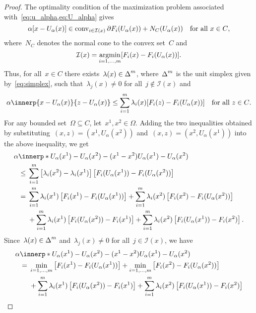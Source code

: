 \documentclass[../../main]{subfiles}
\begin{document}
\begin{proof}
    The optimality condition of the maximization problem associated with~\cref{eq:u_alpha,eq:U_alpha} gives
    \[
        \alpha [ x - U_\alpha(x) ] \in \operatorname{conv}_{i \in \mathcal{I}(x)} \partial F_i(U_\alpha(x)) + N_C(U_\alpha(x)) \quad \text{for all~$x \in C$}
    ,\]
    where~$N_C$ denotes the normal cone to the convex set~$C$ and
    \[
        \mathcal{I}(x) = \operatorname*{argmin}_{i = 1, \dots, m} [ F_i(x) - F_i(U_\alpha(x)) ]
    .\]
    Thus, for all~$x \in C$ there exists~$\lambda(x) \in \operatorname{\Delta}^m$, where~$\operatorname{\Delta}^m$ is the unit simplex given by~\cref{eq:simplex}, such that~$\lambda_j(x) \neq 0$ for all~$j \notin \mathcal{I}(x)$ and
    \[
        \alpha \innerp{x - U_\alpha(x)}{z - U_\alpha(x)} \le \sum_{i = 1}^{m} \lambda_i(x) [ F_i(z) - F_i(U_\alpha(x)) ] \forallcondition{z \in C}
    .\] 
    For any bounded set~$\Omega \subseteq C$, let~$x^1, x^2 \in \Omega$.
    Adding the two inequalities obtained by substituting~$(x, z) = (x^1, U_\alpha(x^2))$ and~$(x, z) = (x^2, U_\alpha(x^1))$ into the above inequality, we get
    \begin{align}
        \MoveEqLeft \alpha \innerp*{U_\alpha(x^1) - U_\alpha(x^2) - (x^1 - x^2)}{U_\alpha(x^1) - U_\alpha(x^2)} \\
        \le{}& \sum_{i = 1}^{m} \left[\lambda_i(x^2) - \lambda_i(x^1)\right] \left[ F_i(U_\alpha(x^1)) - F_i(U_\alpha(x^2)) \right] \\
        ={}& \sum_{i = 1}^{m} \lambda_i(x^1) \left[ F_i(x^1) - F_i(U_\alpha(x^1)) \right] + \sum_{i = 1}^{m} \lambda_i(x^2) \left[ F_i(x^2) - F_i(U_\alpha(x^2)) \right] \\
           &+ \sum_{i = 1}^{m} \lambda_i(x^1) \left[ F_i(U_\alpha(x^2)) - F_i(x^1) \right] + \sum_{i = 1}^{m} \lambda_i(x^2) \left[ F_i(U_\alpha(x^1)) - F_i(x^2) \right]
    .\end{align}
    Since~$\lambda(x) \in \operatorname{\Delta}^m$ and~$\lambda_j(x) \neq 0$ for all~$j \in \mathcal{I}(x)$, we have
    \begin{align}
        \MoveEqLeft \alpha \innerp*{U_\alpha(x^1) - U_\alpha(x^2) - (x^1 - x^2)}{U_\alpha(x^1) - U_\alpha(x^2)} \\
        ={}& \min_{i = 1, \dots, m} \left[ F_i(x^1) - F_i(U_\alpha(x^1)) \right] + \min_{i = 1, \dots, m} \left[ F_i(x^2) - F_i(U_\alpha(x^2)) \right] \\
           &+ \sum_{i = 1}^{m} \lambda_i(x^1) \left[ F_i(U_\alpha(x^2)) - F_i(x^1) \right] + \sum_{i = 1}^{m} \lambda_i(x^2) \left[ F_i(U_\alpha(x^1)) - F_i(x^2) \right]
    \end{align}

\end{proof}
\end{document}
